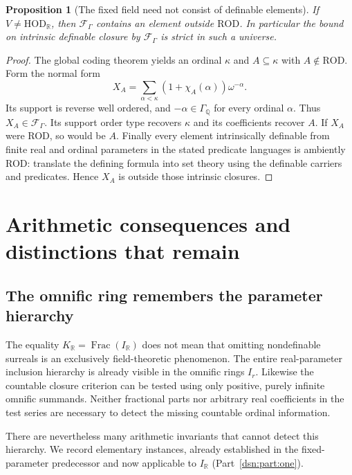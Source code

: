 \documentclass[11pt,a4paper]{article}
\numberwithin{equation}{section}
\newtheorem{proposition}[proposition]{Proposition}
\theoremstyle{definition}
\theoremstyle{remark}
\newcommand{\HOD}{\mathrm{HOD}}
\newcommand{\Q}{\mathbb Q}
\newcommand{\R}{\mathbb R}
\newcommand{\ROD}{\mathrm{ROD}}
\newcommand{\HR}{\HOD_{\R}}
\newcommand{\KR}{K_{\R}}
\newcommand{\IR}{I_{\R}}
\begin{document}
\begin{proposition}[The fixed field need not consist of definable elements]
\label{dsn:rp:prop:fixed-not-definable}
If $V\ne\HR$, then $\mathcal F_\Gamma$ contains an element outside $\ROD$.
In particular the bound on intrinsic definable closure by
$\mathcal F_\Gamma$ is strict in such a universe.
\end{proposition}
\begin{proof}
The global coding theorem yields an ordinal $\kappa$ and
$A\subseteq\kappa$ with $A\notin\ROD$. Form the normal form
\[
 X_A=\sum_{\alpha<\kappa}(1+\chi_A(\alpha))\omega^{-\alpha}.
\]
Its support is reverse well ordered, and $-\alpha\in \Gamma_{\Q}$ for every
ordinal $\alpha$. Thus $X_A\in\mathcal F_\Gamma$. Its support order type
recovers $\kappa$ and its coefficients recover $A$. If $X_A$ were
ROD, so would be $A$. Finally every element intrinsically definable
from finite real and ordinal parameters in the stated predicate
languages is ambiently ROD: translate the defining formula into set
theory using the definable carriers and predicates. Hence $X_A$ is
outside those intrinsic closures.
\end{proof}



\section{Arithmetic consequences and distinctions that remain}
\label{dsn:rp:sec:consequences}

\subsection{The omnific ring remembers the parameter hierarchy}

The equality $\KR=\operatorname{Frac}(\IR)$ does not mean that
omitting nondefinable surreals is an exclusively field-theoretic
phenomenon. The entire real-parameter inclusion hierarchy is already
visible in the omnific rings $I_r$. Likewise the countable closure
criterion can be tested using only positive, purely infinite omnific
summands. Neither fractional parts nor arbitrary real coefficients in
the test series are necessary to detect the missing countable ordinal
information.

There are nevertheless many arithmetic invariants that cannot detect
this hierarchy. We record elementary instances, already established in
the fixed-parameter predecessor and now applicable to $\IR$
(Part~\ref{dsn:part:one}).
\end{document}
